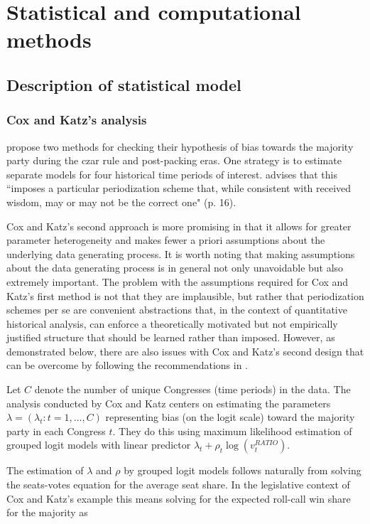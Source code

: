 \section{Statistical and computational methods}
\subsection{Description of statistical model}
\label{subsection_methods}

\subsubsection{Cox and Katz's analysis}

 propose two methods for checking their hypothesis of bias towards the majority party during the czar rule and post-packing eras. One strategy is to estimate separate models for four historical time periods of interest.  advises that this ``imposes a particular periodization scheme that, while consistent with received wisdom, may or may not be the correct one" (p. 16). 

Cox and Katz's second approach is more promising in that it allows for greater parameter heterogeneity and makes fewer a priori assumptions about the underlying data generating process. It is worth noting that making assumptions about the data generating process is in general not only unavoidable but also extremely important. The problem with the assumptions required for Cox and Katz's first method is not that they are implausible, but rather that periodization schemes per se are convenient abstractions that, in the context of quantitative historical analysis, can enforce a theoretically motivated but not empirically justified structure that should be learned rather than imposed. However, as demonstrated below, there are also issues with Cox and Katz's second design that can be overcome by following the recommendations in . 

Let $C$ denote the number of unique Congresses (time periods) in the data. The analysis conducted by Cox and Katz centers on estimating the parameters  $\lambda = (\lambda_t : t = 1, \dots, C)$ representing bias (on the logit scale) toward the majority party in each Congress $t$. They do this using maximum likelihood estimation of grouped logit models with linear predictor $ \lambda_t + \rho_t \log{\left(v_t^{RATIO} \right)}$. 

The estimation of $\lambda$ and $\rho$ by grouped logit models follows naturally from solving the seats-votes equation for the average seat share. In the legislative context of Cox and Katz's example this means solving for the expected roll-call win share for the majority as

